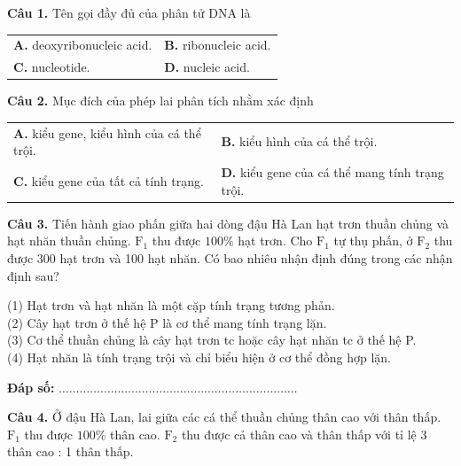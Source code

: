 \documentclass{article}
\begin{document}
\textbf{Câu 1.} Tên gọi đầy đủ của phân tử DNA là
\vspace{6pt}

\begin{tabularx}{\linewidth}{@{}X X@{}}
\textbf{A.} deoxyribonucleic acid. & \textbf{B.} ribonucleic acid.\\[8pt]
\textbf{C.} nucleotide. & \textbf{D.} nucleic acid.
\end{tabularx}

\vspace*{\fill}

\textbf{Câu 2.} Mục đích của phép lai phân tích nhằm xác định
\vspace{6pt}

\begin{tabularx}{\linewidth}{@{}X X@{}}
\textbf{A.} kiểu gene, kiểu hình của cá thể trội. & \textbf{B.} kiểu hình của cá thể trội.\\[8pt]
\textbf{C.} kiểu gene của tất cả tính trạng. & \textbf{D.} kiểu gene của cá thể mang tính trạng trội.
\end{tabularx}
\vspace*{\fill}
\newpage

\fontsize{24}{32}\selectfont
\textbf{Câu 3.} Tiến hành giao phấn giữa hai dòng đậu Hà Lan hạt trơn thuần chủng và hạt nhăn thuần chủng. $\text{F}_1$ thu được $100\%$ hạt trơn. Cho $\text{F}_1$ tự thụ phấn, ở $\text{F}_2$ thu được 300 hạt trơn và 100 hạt nhăn. Có bao nhiêu nhận định đúng trong các nhận định sau?
\vspace{8pt}

(1) Hạt trơn và hạt nhăn là một cặp tính trạng tương phản.\\[4pt]
(2) Cây hạt trơn ở thế hệ P là cơ thể mang tính trạng lặn.\\[4pt]
(3) Cơ thể thuần chủng là cây hạt trơn tc hoặc cây hạt nhăn tc ở thế hệ P.\\[4pt]
(4) Hạt nhăn là tính trạng trội và chỉ biểu hiện ở cơ thể đồng hợp lặn.
\vspace{12pt}

\textbf{Đáp số:} $\dots\dots\dots\dots\dots\dots\dots\dots\dots\dots\dots\dots\dots\dots\dots\dots\dots\dots\dots\dots\dots\dots\dots$
\vspace*{\fill}
\newpage

\fontsize{26}{34}\selectfont
\textbf{Câu 4.} Ở đậu Hà Lan, lai giữa các cá thể thuần chủng thân cao với thân thấp. $\text{F}_1$ thu được $100\%$ thân cao. $\text{F}_2$ thu được cả thân cao và thân thấp với tỉ lệ 3 thân cao : 1 thân thấp.
\vspace{8pt}
\end{document}
